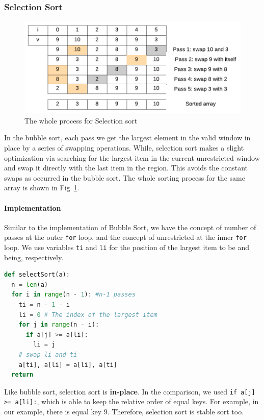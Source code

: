 \documentclass[../main.tex]{subfiles}
\begin{document}
\subsubsection{Selection Sort}
\begin{figure}[!ht]
    \centering
    \includegraphics[width=0.98\columnwidth]{fig/selection_sort.png}
    \caption{The whole process for Selection sort}
    \label{fig:selection_sort}
\end{figure}
In the bubble sort, each pass we get the largest element in the valid window in place by a series of swapping operations. While, selection sort makes a slight optimization via searching for the largest item in the current unrestricted window and swap it directly with the last item in the  region. This avoids the constant swaps as occurred in the bubble sort. The whole sorting process for the same array is shown in Fig~\ref{fig:selection_sort}.

\paragraph{Implementation} Similar to the implementation of Bubble Sort, we have the concept of number of passes at the outer \texttt{for} loop, and the concept of unrestricted  at the inner \texttt{for} loop. We use variables \texttt{ti} and 
\texttt{li} for the position of the largest item to be and being, respectively.
\begin{lstlisting}[language = Python]
def selectSort(a):
  n = len(a)
  for i in range(n - 1): #n-1 passes 
    ti = n - 1 - i
    li = 0 # The index of the largest item
    for j in range(n - i):
      if a[j] >= a[li]:
        li = j
    # swap li and ti
    a[ti], a[li] = a[li], a[ti]
  return 
\end{lstlisting}
Like bubble sort, selection sort is \textbf{in-place}. In the comparison, we used \texttt{if a[j] >= a[li]:}, which is able to keep the relative order of equal keys. For example, in our example, there is equal key $9$. Therefore, selection sort is stable sort too.
\end{document}
